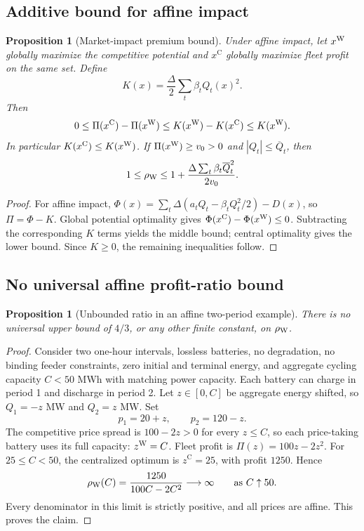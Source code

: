 \documentclass[11pt]{article}
\newtheorem{proposition}[assumption]{Proposition}
\theoremstyle{remark}
\newcommand{\cen}{\mathrm C}
\begin{document}
\subsection{Additive bound for affine impact}
\begin{proposition}[Market-impact premium bound]
\label{prop:impactbound}
Under affine impact, let $x^{\rm W}$ globally maximize the competitive
potential and $x^{\cen}$ globally maximize fleet profit on the same set.
Define
\begin{equation}
 K(x)=\frac{\Delta}{2}\sum_t\beta_tQ_t(x)^2.
 \label{eq:impactpenalty}
\end{equation}
Then
\begin{equation}
 0\le\Pi(x^{\cen})-\Pi(x^{\rm W})
 \le K(x^{\rm W})-K(x^{\cen})
 \le K(x^{\rm W}).
 \label{eq:impactbound}
\end{equation}
In particular $K(x^{\cen})\le K(x^{\rm W})$. If $\Pi(x^{\rm W})\ge v_0>0$
and $|Q_t|\le\overline Q_t$, then
\begin{equation}
 1\le\rho_{\rm W}
 \le1+\frac{\Delta\sum_t\beta_t\overline Q_t^2}{2v_0}.
 \label{eq:conditionalratio}
\end{equation}
\end{proposition}
\begin{proof}
For affine impact, $\Phi(x)=\sum_t\Delta(a_tQ_t-\beta_tQ_t^2/2)-D(x)$,
so $\Pi=\Phi-K$. Global potential optimality gives
$\Phi(x^{\cen})-\Phi(x^{\rm W})\le0$. Subtracting the corresponding
$K$ terms yields the middle bound; central optimality gives the lower
bound. Since $K\ge0$, the remaining inequalities follow.
\end{proof}


\subsection{No universal affine profit-ratio bound}
\begin{proposition}[Unbounded ratio in an affine two-period example]
\label{prop:counterexample}
There is no universal upper bound of $4/3$, or any other finite constant,
on $\rho_{\rm W}$.
\end{proposition}
\begin{proof}
Consider two one-hour intervals, lossless batteries, no degradation, no
binding feeder constraints, zero initial and terminal energy, and aggregate
cycling capacity $C<50$ MWh with matching power capacity. Each battery can
charge in period 1 and discharge in period 2. Let $z\in[0,C]$ be aggregate
energy shifted, so $Q_1=-z$ MW and $Q_2=z$ MW. Set
\[
 p_1=20+z,\qquad p_2=120-z.
\]
The competitive price spread is $100-2z>0$ for every $z\le C$, so each
price-taking battery uses its full capacity: $z^{\rm W}=C$. Fleet profit is
$\Pi(z)=100z-2z^2$. For $25\le C<50$, the centralized optimum is
$z^{\cen}=25$, with profit $1250$. Hence
\[
 \rho_{\rm W}(C)=\frac{1250}{100C-2C^2}\longrightarrow\infty
 \qquad\text{as }C\uparrow50.
\]
Every denominator in this limit is strictly positive, and all prices are
affine. This proves the claim.
\end{proof}
\end{document}
